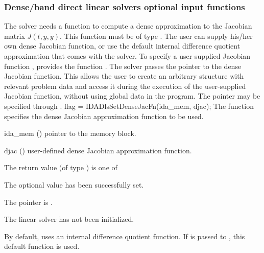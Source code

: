 {\subsubsection{Dense/band direct linear solvers optional input functions}
\label{sss:optin_dls}
The 
{\idadense} solver needs a function to compute a dense approximation to
the Jacobian matrix $J(t,y,\dot{y})$.  
This function must be of type . 
The user can supply his/her own dense Jacobian function, or use the default 
internal difference quotient approximation
that comes with the {\idadense} solver.
To specify a user-supplied Jacobian function , {\idadense} provides 
the function .
The {\idadense} solver passes the pointer  
to the dense Jacobian function. This allows the user to
create an arbitrary structure with relevant problem data and access it
during the execution of the user-supplied Jacobian function, without
using global data in the program. 
The pointer  may be specified through .
{
  flag = IDADlsSetDenseJacFn(ida\_mem, djac);
}
{
  The function  specifies the dense Jacobian
  approximation function to be used.
}
{
  \begin{args}
  \item[ida\_mem] ()
    pointer to the {\idas} memory block.
  \item[djac] ()
    user-defined dense Jacobian approximation function.
  \end{args}
}
{
  The return value  (of type ) is one of
  \begin{args}
  \item[\Id{IDADLS\_SUCCESS}] 
    The optional value has been successfully set.
  \item[\Id{IDADLS\_MEM\_NULL}]
    The  pointer is .
  \item[\Id{IDADLS\_LMEM\_NULL}]
    The {\idadense} linear solver has not been initialized.
  \end{args}
}
{
  By default, {\idadense} uses an internal difference quotient function.
  If  is passed to , this default function is used.

}}
